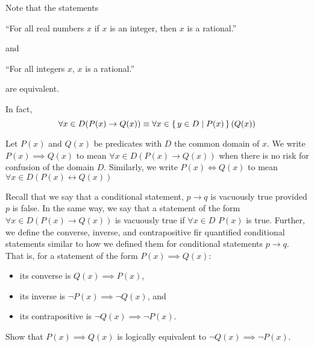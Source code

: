 






Note that the statements
\begin{center}
	``For all real numbers $x$ if $x$ is an integer, then $x$ is a rational.''
\end{center}
and
\begin{center}
	``For all integers $x$, $x$ is a rational.''
\end{center}
are equivalent.

In fact, \[\forall x\in D(P(x)\rightarrow Q(x) )\equiv \forall x\in \left\{\,y\in D\mid P(x)\,\right\}( Q(x) )\]


Let $P(x)$ and $Q(x)$ be predicates with $D$ the common domain of $x$.
We write $P(x)\implies Q(x)$ to mean $\forall x\in D( P(x)\rightarrow Q(x))$ when there is no risk for confusion of the domain $D$.
Similarly, we write $P(x)\iff Q(x)$ to mean $\forall x\in D( P(x)\leftrightarrow Q(x))$







Recall that we say that a conditional statement, $p\rightarrow q$ is vacuously true provided $p$ is false.
In the same way, we say that a statement of the form $\forall x\in D(P(x)\rightarrow Q(x))$ is vacuously true if $\forall x\in D$ $P(x)$ is true.
Further, we define the converse, inverse, and contrapositive fir quantified conditional statements similar to how we defined them for conditional statements $p\rightarrow q$.
That is, for a statement of the form $P(x)\implies Q(x)$:
\begin{itemize}
  \item its converse is $Q(x)\implies P(x)$,
  \item its inverse is $\neg P(x) \implies \neg Q(x)$, and
  \item its contrapositive is $\neg Q(x) \implies \neg P(x)$.
\end{itemize}

\begin{exercise}
  Show that $P(x)\implies Q(x)$ is logically equivalent to $\neg Q(x)\implies \neg P(x)$.
\end{exercise}

